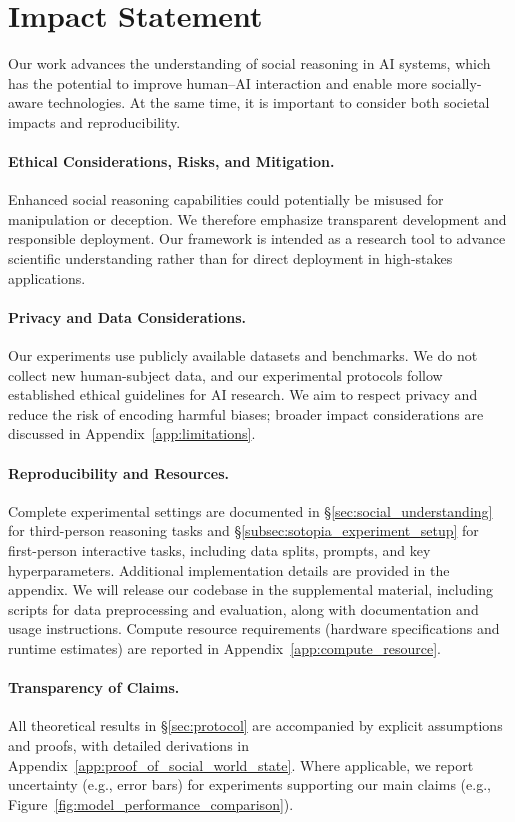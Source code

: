 \section*{Impact Statement}
Our work advances the understanding of social reasoning in AI systems, which has the potential to improve human--AI interaction and enable more socially-aware technologies. At the same time, it is important to consider both societal impacts and reproducibility.

\paragraph{Ethical Considerations, Risks, and Mitigation.}
Enhanced social reasoning capabilities could potentially be misused for manipulation or deception. We therefore emphasize transparent development and responsible deployment. Our framework is intended as a research tool to advance scientific understanding rather than for direct deployment in high-stakes applications.

\paragraph{Privacy and Data Considerations.}
Our experiments use publicly available datasets and benchmarks. We do not collect new human-subject data, and our experimental protocols follow established ethical guidelines for AI research. We aim to respect privacy and reduce the risk of encoding harmful biases; broader impact considerations are discussed in Appendix~\ref{app:limitations}.

\paragraph{Reproducibility and Resources.}
Complete experimental settings are documented in \S\ref{sec:social_understanding} for third-person reasoning tasks and \S\ref{subsec:sotopia_experiment_setup} for first-person interactive tasks, including data splits, prompts, and key hyperparameters. Additional implementation details are provided in the appendix. We will release our codebase in the supplemental material, including scripts for data preprocessing and evaluation, along with documentation and usage instructions. Compute resource requirements (hardware specifications and runtime estimates) are reported in Appendix~\ref{app:compute_resource}.

\paragraph{Transparency of Claims.}
All theoretical results in \S\ref{sec:protocol} are accompanied by explicit assumptions and proofs, with detailed derivations in Appendix~\ref{app:proof_of_social_world_state}. Where applicable, we report uncertainty (e.g., error bars) for experiments supporting our main claims (e.g., Figure~\ref{fig:model_performance_comparison}).


